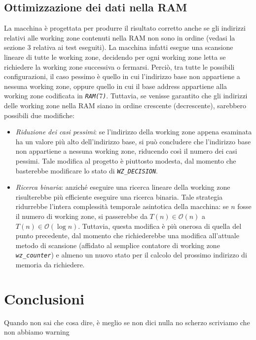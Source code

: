 \documentclass[12pt,a4paper,titlepage]{article}
\begin{document}
		\subsection{Ottimizzazione dei dati nella RAM}
			La macchina è progettata per produrre il risultato corretto anche se gli indirizzi relativi alle working zone contenuti nella RAM non sono in ordine (vedasi la sezione 3 relativa ai test eseguiti). La macchina infatti esegue una scansione lineare di tutte le working zone, decidendo per ogni working zone letta se richiedere la working zone successiva o fermarsi. Perciò, tra tutte le possibili configurazioni, il caso pessimo è quello in cui l'indirizzo base non appartiene a nessuna working zone, oppure quello in cui il base address appartiene alla working zone codificata in \textit{\texttt{RAM($7$)}}.
			Tuttavia, se venisse garantito che gli indirizzi delle working zone nella RAM siano in ordine crescente (decrescente), sarebbero possibili due modifiche:
			\begin{itemize}
			\item \textit{Riduzione dei casi pessimi}: se l'indirizzo della working zone appena esaminata ha un valore più alto dell'indirizzo base, si può concludere che l'indirizzo base non appartiene a nessuna working zone, riducendo così il numero dei casi pessimi. Tale modifica al progetto è piuttosto modesta, dal momento che basterebbe modificare lo stato di \textit{\texttt{WZ\_DECISION}}.
			\item \textit{Ricerca binaria}: anziché eseguire una ricerca lineare della working zone risulterebbe più efficiente eseguire una ricerca binaria. Tale strategia ridurrebbe l'intera complessità temporale asintotica della macchina: se $n$ fosse il numero di working zone, si passerebbe da $T(n) \in \mathcal{O}(n)$ a $T(n) \in \mathcal{O}(\log n)$. Tuttavia, questa modifica è più onerosa di quella del punto precedente, dal momento che richiederebbe una modifica all'attuale metodo di scansione (affidato al semplice contatore di working zone \textit{\texttt{wz\_counter}}) e almeno un nuovo stato per il calcolo del prossimo indirizzo di memoria da richiedere.
			\end{itemize}
		\section{Conclusioni}
			Quando non sai che cosa dire, è meglio se non dici nulla
				\newline \newline \newline no scherzo scriviamo che non abbiamo warning
		
\end{document}
